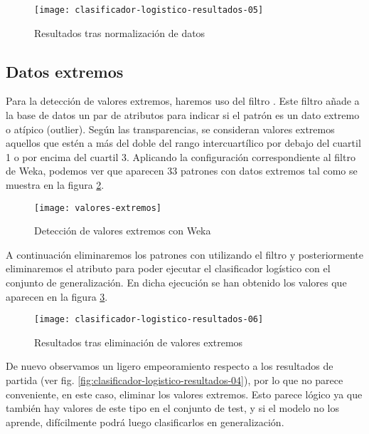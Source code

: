 \begin{figure}[ht]
    \centering
    \texttt{[image: clasificador-logistico-resultados-05]}
    \caption{Resultados tras normalización de datos}
    \label{fig:clasificador-logistico-resultados-05}
\end{figure}

\subsection{Datos extremos}
Para la detección de valores extremos, haremos uso del filtro . Este filtro añade a la base de datos un par de atributos para indicar si el patrón es un dato extremo o atípico (outlier). Según las transparencias, se consideran valores extremos aquellos que estén a más del doble del rango intercuartílico por debajo del cuartil 1 o por encima del cuartil 3. Aplicando la configuración correspondiente al filtro de Weka, podemos ver que aparecen 33 patrones con datos extremos tal como se muestra en la figura \ref{fig:valores-extremos}.
\begin{figure}[ht]
    \centering
    \texttt{[image: valores-extremos]}
    \caption{Detección de valores extremos con Weka}
    \label{fig:valores-extremos}
\end{figure}
A continuación eliminaremos los patrones con  utilizando el filtro  y posteriormente eliminaremos el atributo  para poder ejecutar el clasificador logístico con el conjunto de generalización. En dicha ejecución se han obtenido los valores que aparecen en la figura \ref{fig:clasificador-logistico-resultados-06}.

\begin{figure}[ht]
    \centering
    \texttt{[image: clasificador-logistico-resultados-06]}
    \caption{Resultados tras eliminación de valores extremos}
    \label{fig:clasificador-logistico-resultados-06}
\end{figure}

De nuevo observamos un ligero empeoramiento respecto a los resultados de partida (ver fig. \ref{fig:clasificador-logistico-resultados-04}), por lo que no parece conveniente, en este caso, eliminar los valores extremos. Esto parece lógico ya que también hay valores de este tipo en el conjunto de test, y si el modelo no los aprende, difícilmente podrá luego clasificarlos en generalización.